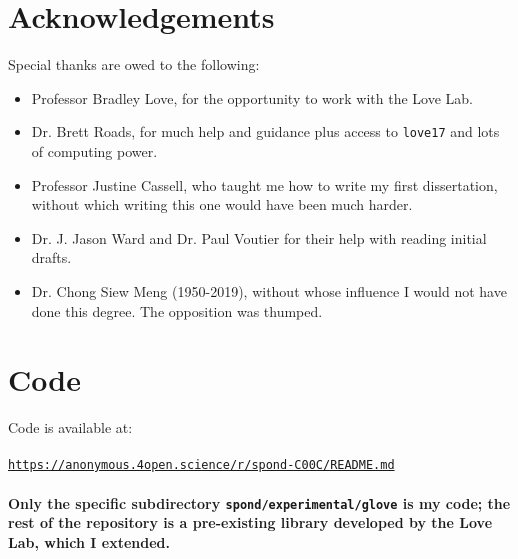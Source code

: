 
\newpage
\section*{Acknowledgements}

Special thanks are owed to the following:

\begin{itemize}
    \item Professor Bradley Love, for the opportunity to work with the Love Lab.
    \item Dr. Brett Roads, for much help and guidance plus access to \texttt{love17} and lots of computing power. 
    \item Professor Justine Cassell, who taught me how to write my first dissertation, without which writing this one would have been much harder. 
    \item Dr. J. Jason Ward and Dr. Paul Voutier for their help with reading initial drafts.
    \item Dr. Chong Siew Meng (1950-2019), without whose influence I would not have done this degree. The opposition was thumped.
\end{itemize}

\section*{Code}
Code is available at: \\
\\
\texttt{\href{https://anonymous.4open.science/r/spond-C00C/README.md}{https://anonymous.4open.science/r/spond-C00C/README.md}}
\\
\\
\textbf{Only the specific subdirectory \texttt{spond/experimental/glove} is my code; the rest of the repository is a pre-existing library developed by the Love Lab, which I extended. }